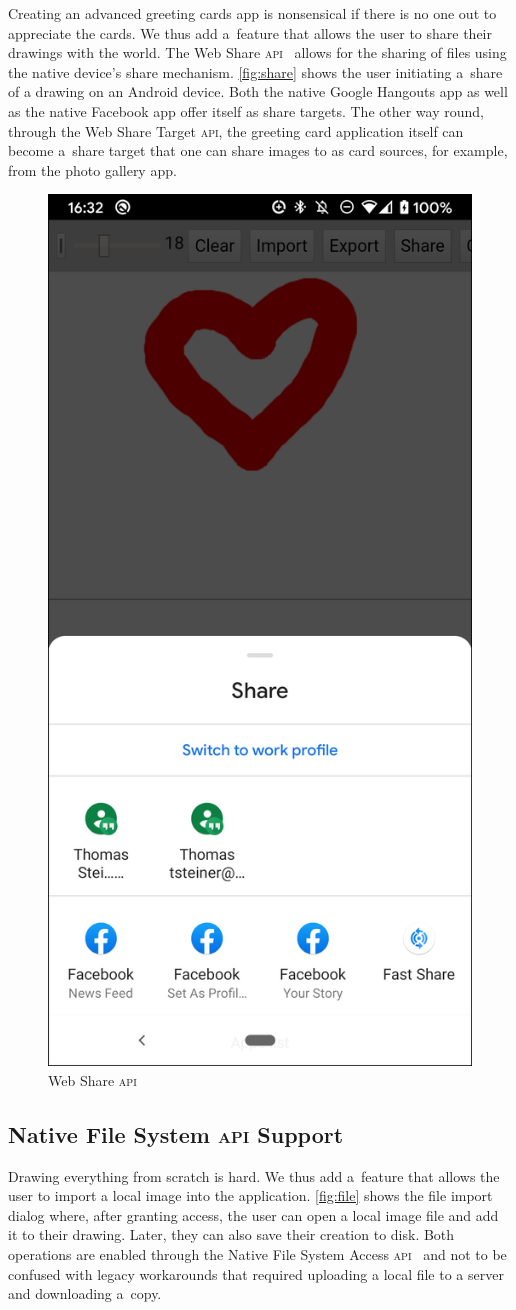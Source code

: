 \documentclass[sigconf]{acmart}
\begin{document}
Creating an advanced greeting cards app is nonsensical if there is no one out to appreciate the cards.
We thus add a~feature that allows the user to share their drawings with the world.
The Web Share \textsc{api}~\cite{giuca2017webshare} allows for the sharing of files
using the native device's share mechanism.
\autoref{fig:share} shows the user initiating a~share of a drawing on an Android device.
Both the native Google Hangouts app as well as the native Facebook app offer itself
as share targets.
The other way round, through the Web Share Target \textsc{api},
the greeting card application itself can become a~share target
that one can share images to as card sources, for example, from the photo gallery app.

\begin{figure}[hbt]
  \includegraphics[width=0.3\columnwidth]{share.png}
  \caption{Web Share \textsc{api}}
  \label{fig:share}
\end{figure}

\subsection{Native File System \textsc{api} Support}

Drawing everything from scratch is hard.
We thus add a~feature that allows the user to import a local image into the application.
\autoref{fig:file} shows the file import dialog where, after granting access,
the user can open a local image file and add it to their drawing.
Later, they can also save their creation to disk.
Both operations are enabled through the Native File System Access \textsc{api}~\cite{kruisselbrink19}
and not to be confused with legacy workarounds that required uploading a local file to a server
and downloading a~copy.
\end{document}
